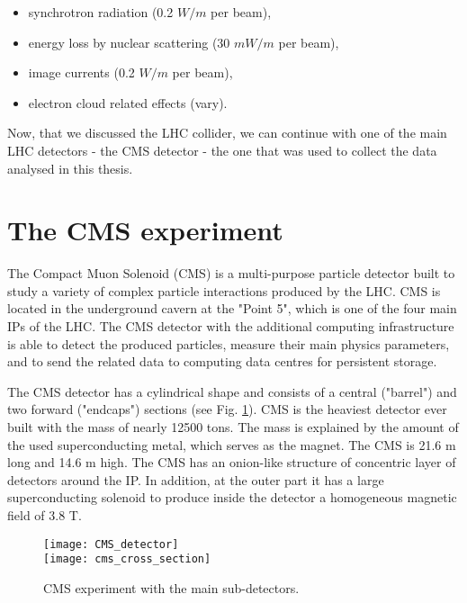 \begin{normalsize}
\begin{itemize}
\item synchrotron radiation (0.2 $W/m$ per beam),
\item energy loss by nuclear scattering (30 $mW/m$ per beam),
\item image currents (0.2 $W/m$ per beam),
\item electron cloud related effects (vary).
\end{itemize}



Now, that we discussed the LHC collider, we can continue with one of the main LHC detectors - the CMS detector - the one that was used to collect the data analysed in this thesis. 



\section{The CMS experiment}

                

The Compact Muon Solenoid (CMS) is a multi-purpose particle detector built to study a variety of complex particle interactions produced by the LHC. CMS is located in the underground cavern at the "Point 5", which is one of the four main IPs of the LHC. The CMS detector with the additional computing infrastructure is able to detect the produced particles, measure their main physics parameters, and to send the related data to computing data centres for persistent storage. 


The CMS detector has a cylindrical shape and consists of a central ("barrel") and two forward ("endcaps") sections (see Fig. \ref{CMS_detector}). 
CMS is the heaviest detector ever built with the mass of nearly 12500 tons. The mass is explained by the amount of the used superconducting metal, which serves as the magnet. The CMS is 21.6 m long and 14.6 m high. The CMS has an onion-like structure of concentric layer of detectors around the IP. In addition, at the outer part it has a large superconducting solenoid to produce inside the detector a homogeneous magnetic field of 3.8 T.

\begin{figure}[H]
  \centering
  \texttt{[image: CMS\_detector]}\\
  \vspace{1cm}
  \texttt{[image: cms\_cross\_section]}
  \caption{CMS experiment with the main sub-detectors.}
  \label{CMS_detector}
\end{figure}



\end{normalsize}

